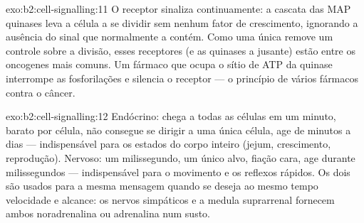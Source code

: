 \begin{solution}{exo:b2:cell-signalling:11}
O receptor sinaliza continuamente: a cascata das MAP quinases leva a
célula a se dividir sem nenhum fator de crescimento, ignorando a
ausência do sinal que normalmente a contém. Como uma única 
remove um controle sobre a divisão, esses receptores (e as quinases a
jusante) estão entre os oncogenes mais comuns. Um fármaco que ocupa o
sítio de ATP da quinase interrompe as fosforilações e silencia o
receptor --- o princípio de vários fármacos contra o câncer.
\end{solution}

\begin{solution}{exo:b2:cell-signalling:12}
Endócrino: chega a todas as células em um minuto, barato por célula,
não consegue se dirigir a uma única célula, age de minutos a dias ---
indispensável para os estados do corpo inteiro (jejum, crescimento,
reprodução). Nervoso: um milissegundo, um único alvo, fiação cara, age
durante milissegundos --- indispensável para o movimento e os reflexos
rápidos. Os dois são usados para a mesma mensagem quando se deseja ao
mesmo tempo velocidade e alcance: os nervos simpáticos e a medula
suprarrenal fornecem ambos noradrenalina ou adrenalina num susto.
\end{solution}

